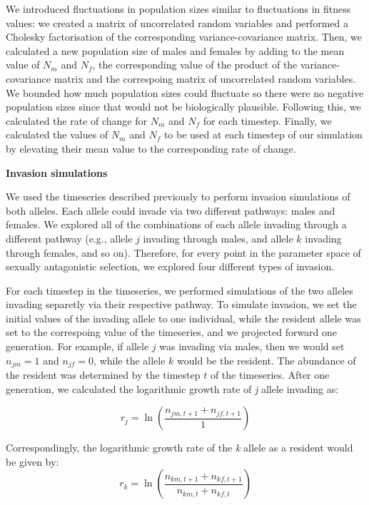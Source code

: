 \documentclass[]{article}
\begin{document}
We introduced fluctuations in population sizes similar to fluctuations in fitness values: we created a matrix of uncorrelated random variables and performed a Cholesky factorisation of the corresponding variance-covariance matrix. Then, we calculated a new population size of males and females by adding to the mean value of $N_{m}$ and $N_{f}$, the corresponding value of the product of the variance-covariance matrix and the correspoing matrix of uncorrelated random variables. We bounded how much population sizes could fluctuate so there were no negative population sizes since that would not be biologically plausible. Following this, we calculated the rate of change for $N_{m}$ and $N_{f}$ for each timestep. Finally, we calculated the values of $N_{m}$ and $N_{f}$ to be used at each timestep of our simulation by elevating their mean value to the corresponding rate of change.

\vspace{5mm}
\noindent\textbf{Invasion simulations}

We used the timeseries described previously to perform invasion simulations of both alleles. Each allele could invade via two different pathways: males and females. We explored all of the combinations of each allele invading through a different pathway (e.g., allele $j$ invading through males, and allele $k$ invading through females, and so on). Therefore, for every point in the parameter space of sexually antagonistic selection, we explored four different types of invasion.

For each timestep in the timeseries, we performed simulations of the two alleles invading separetly via their respective pathway. To simulate invasion, we set the initial values of the invading allele to one individual, while the resident allele was set to the correspoing value of the timeseries, and we projected forward one generation. For example, if allele $j$ was invading via males, then we would set $n_{jm} = 1$ and $n_{jf}= 0$, while the allele $k$ would be the resident. The abundance of the resident was determined by the timestep $t$ of the timeseries. After one generation, we calculated the logarithmic growth rate of \textit{j} allele invading as:

\begin{equation}
r_{j} =	\ln \left ( \frac{n_{jm,t +1 } + n_{jf,t+1}}{1} \right )
\label{invader}
\end{equation}

Correspondingly, the logarithmic growth rate of the \textit{k} allele as a resident would be given by:
\begin{equation}
r_{k} =	\ln \left ( \frac{ n_{km,t+1} + n_{kf,t+1} }{ n_{km,t} + n_{kf,t}  } \right )
\label{resident}
\end{equation}
\end{document}
